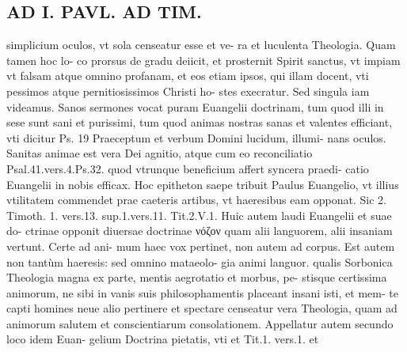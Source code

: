 \documentclass{article}
\begin{document}
\begin{pages}
\section*{AD I. PAVL. AD TIM. }
\marginpar{[ p.42o ]}\pstart simplicium oculos, vt sola censeatur esse et ve- ra et luculenta Theologia. Quam tamen hoc lo- co prorsus de gradu deiicit, et prosternit Spirit sanctus, vt impiam vt falsam atque omnino profanam, et eos etiam ipsos, qui illam docent, vti pessimos atque pernitiosissimos Christi ho- stes execratur.  \pend\pstart Sed singula iam videamus. Sanos sermones vocat puram Euangelii doctrinam, tum quod illi in sese sunt sani et purissimi, tum quod animas nostras sanas et valentes efficiant, vti dicitur Ps. 19 Praeceptum et verbum Domini lucidum, illumi- nans oculos. Sanitas animae est vera Dei agnitio, atque cum eo reconciliatio Psal.41.vers.4.Ps.32. quod vtrunque beneficium affert syncera praedi- catio Euangelii in nobis efficax. Hoc epitheton saepe tribuit Paulus Euangelio, vt illius vtilitatem commendet prae caeteris artibus, vt haeresibus eam opponat. Sic 2. Timoth. 1. vers.13. sup.1.vers.11. Tit.2.V.1. Huic autem laudi Euangelii et suae do- ctrinae opponit diuersae doctrinae νόζον quam alii languorem, alii insaniam vertunt. Certe ad ani- mum haec vox pertinet, non autem ad corpus. Est autem non tantùm haeresis: sed omnino mataeolo- gia animi languor. qualis Sorbonica Theologia magna ex parte, mentis aegrotatio et morbus, pe- stisque certissima animorum, ne sibi in vanis suis philosophamentis placeant insani isti, et mem- te capti homines neue alio pertinere et spectare censeatur vera Theologia, quam ad animorum salutem et conscientiarum consolationem.  \pend\pstart Appellatur autem secundo loco idem Euan- gelium Doctrina pietatis, vti et Tit.1. vers.1. et  \pend

\end{pages}
\end{document}
